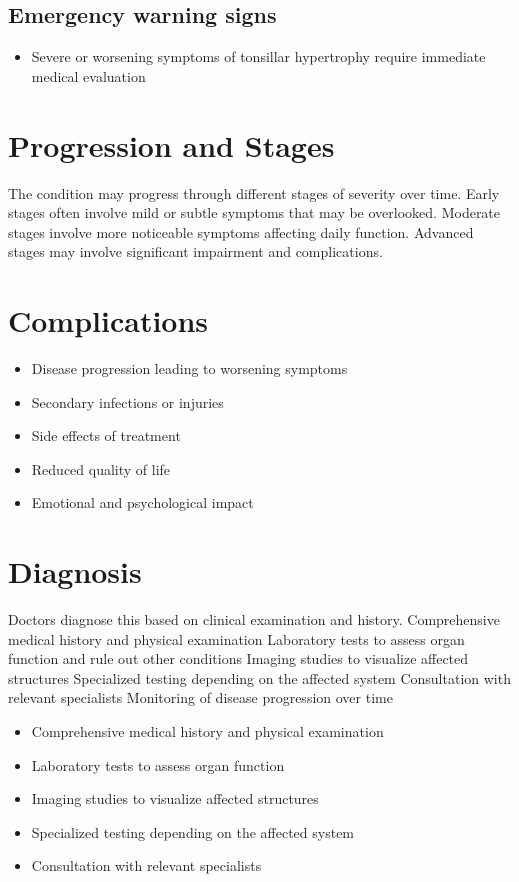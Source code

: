 \subsection{Emergency warning signs}
\begin{itemize}[noitemsep]
  \item Severe or worsening symptoms of tonsillar hypertrophy require immediate medical evaluation
\end{itemize}
\section{Progression and Stages}
The condition may progress through different stages of severity over time. Early stages often involve mild or subtle symptoms that may be overlooked. Moderate stages involve more noticeable symptoms affecting daily function. Advanced stages may involve significant impairment and complications.
\section{Complications}
\begin{itemize}[noitemsep]
  \item Disease progression leading to worsening symptoms
  \item Secondary infections or injuries
  \item Side effects of treatment
  \item Reduced quality of life
  \item Emotional and psychological impact
\end{itemize}
\section{Diagnosis}
Doctors diagnose this based on clinical examination and history. Comprehensive medical history and physical examination Laboratory tests to assess organ function and rule out other conditions Imaging studies to visualize affected structures Specialized testing depending on the affected system Consultation with relevant specialists Monitoring of disease progression over time

\begin{itemize}[noitemsep]
  \item Comprehensive medical history and physical examination
  \item Laboratory tests to assess organ function
  \item Imaging studies to visualize affected structures
  \item Specialized testing depending on the affected system
  \item Consultation with relevant specialists
\end{itemize}
